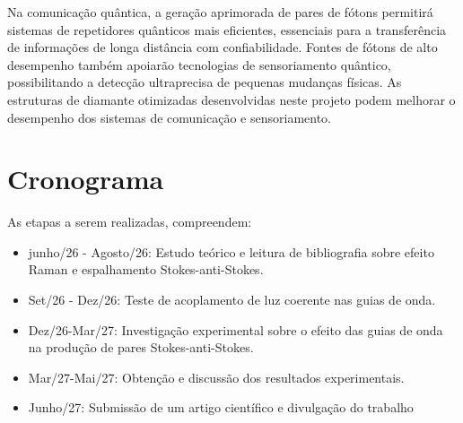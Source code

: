 \documentclass[brazil,12pt,a4paper,openany]{article}
\begin{document}
Na comunicação quântica, a geração aprimorada de pares de fótons permitirá sistemas de repetidores quânticos mais eficientes, essenciais para a transferência de informações de longa distância com confiabilidade. Fontes de fótons de alto desempenho também apoiarão tecnologias de sensoriamento quântico, possibilitando a detecção ultraprecisa de pequenas mudanças físicas. As estruturas de diamante otimizadas desenvolvidas neste projeto podem melhorar o desempenho dos sistemas de comunicação e sensoriamento.
\section{Cronograma}
As etapas a serem realizadas, compreendem:
\begin{itemize}
   \item junho/26 - Agosto/26: Estudo teórico e leitura de bibliografia sobre efeito Raman e espalhamento Stokes-anti-Stokes.
   \item Set/26 - Dez/26: Teste de acoplamento de luz coerente nas guias de onda.
   \item Dez/26-Mar/27: Investigação experimental sobre o efeito das guias de onda na produção de pares Stokes-anti-Stokes.
   \item Mar/27-Mai/27: Obtenção e discussão dos resultados experimentais.
   \item Junho/27: Submissão de um artigo científico e divulgação do trabalho
\end{itemize}



\end{document}
